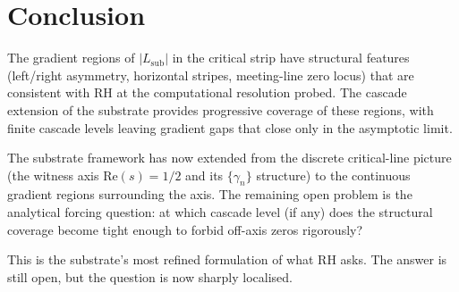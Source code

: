 \documentclass[11pt,a4paper]{article}
\newcommand{\Lsub}{L_{\mathrm{sub}}}
\begin{document}
\section{Conclusion}
\label{sec:conclusion}

The gradient regions of $|\Lsub|$ in the critical strip have
structural features (left/right asymmetry, horizontal stripes,
meeting-line zero locus) that are consistent with RH at the
computational resolution probed. The cascade extension of the
substrate provides progressive coverage of these regions, with
finite cascade levels leaving gradient gaps that close only in
the asymptotic limit.

The substrate framework has now extended from the discrete
critical-line picture (the witness axis $\mathrm{Re}(s) = 1/2$
and its $\{\gamma_n\}$ structure) to the continuous gradient
regions surrounding the axis. The remaining open problem is the
analytical forcing question: at which cascade level (if any)
does the structural coverage become tight enough to forbid
off-axis zeros rigorously?

This is the substrate's most refined formulation of what RH
asks. The answer is still open, but the question is now sharply
localised.
\end{document}
